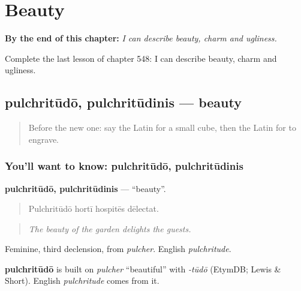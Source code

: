 
\chapter{Beauty}
\label{ch:la-beauty}

\begin{chapteropening}
\textbf{By the end of this chapter:} \emph{I can describe beauty, charm and ugliness.}

Complete the last lesson of chapter 548: I can describe beauty, charm and ugliness.
\end{chapteropening}

\section[pulchritūdō, pulchritūdinis]{pulchritūdō, pulchritūdinis — beauty}

\label{lesson:LA-C548-pulchritudo}



\begin{quote}
Before the new one: say the Latin for a small cube, then the Latin for to engrave.
\end{quote}

\subsection*{You'll want to know: pulchritūdō, pulchritūdinis}
\textbf{pulchritūdō, pulchritūdinis} — \textquotedblleft{}beauty\textquotedblright{}.

\begin{quote}
Pulchritūdō hortī hospitēs dēlectat.
\end{quote}

\begin{quote}
\emph{The beauty of the garden delights the guests.}
\end{quote}

Feminine, third declension, from \emph{pulcher}. English \emph{pulchritude}.

\begin{cousinweb}
\textbf{pulchritūdō} is built on \emph{pulcher} \textquotedblleft{}beautiful\textquotedblright{} with \emph{-tūdō} (EtymDB; Lewis \& Short). English \emph{pulchritude} comes from it.
\end{cousinweb}


